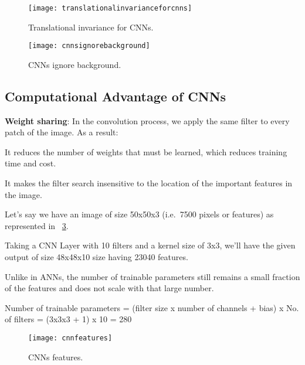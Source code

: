 	\begin{figure}[tbh]
		\centering
		\texttt{[image: translationalinvarianceforcnns]}
		\caption[Translational invariance for CNNs]{Translational invariance for CNNs.}
		\label{fig:translationalinvarianceforcnns}
	\end{figure}

	\begin{figure}[tbh]
		\centering
		\texttt{[image: cnnsignorebackground]}
		\caption[CNNs ignore background]{CNNs ignore background.}
		\label{fig:cnnsignorebackground}
	\end{figure}


	\subsection{Computational Advantage of CNNs}
	\begin{bulletedlist}
		\item \textbf{Weight sharing}: In the convolution process, we apply the same filter to every patch of the image.
As a result:
		\begin{bulletedlist}
			\item It reduces the number of weights that must be learned, which reduces training time and cost.
			\item It makes the filter search insensitive to the location of the important features in the image.
		\end{bulletedlist}
		\item Let's say we have an image of size 50x50x3 (i.e.\ 7500 pixels or features) as represented in \figurename~\ref{fig:cnnfeatures}.
		\begin{bulletedlist}
			\item Taking a CNN Layer with 10 filters and a kernel size of 3x3, we'll have the given output of size 48x48x10 size having 23040 features.
			\item Unlike in ANNs, the number of trainable parameters still remains a small fraction of the features and does not scale with that large number.
			\item Number of trainable parameters = (filter size x number of channels + bias) x No. of filters = (3x3x3 + 1) x 10 = 280
		\end{bulletedlist}
	\end{bulletedlist}

	\begin{figure}[tbh]
		\centering
		\texttt{[image: cnnfeatures]}
		\caption[CNNs features]{CNNs features.}
		\label{fig:cnnfeatures}
	\end{figure}


